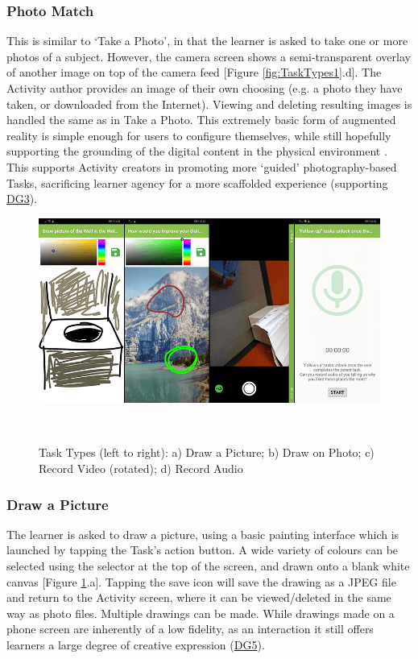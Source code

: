 \subsubsection*{Photo Match}
This is similar to `Take a Photo', in that the learner is asked to take one or more photos of a subject. However, the camera screen shows a semi-transparent overlay of another image on top of the camera feed [Figure \ref{fig:TaskTypes1}.d]. The Activity author provides an image of their own choosing (e.g. a photo they have taken, or downloaded from the Internet). Viewing and deleting resulting images is handled the same as in Take a Photo. This extremely basic form of augmented reality is simple enough for users to configure themselves, while still hopefully supporting the grounding of the digital content in the physical environment \citep{javornik2019}. This supports Activity creators in promoting more `guided' photography-based Tasks, sacrificing learner agency for a more scaffolded experience (supporting \hyperref[DG3]{DG3}).

\begin{figure}
  \centering
  \includegraphics[width=1\columnwidth]{images/chapter05/tasktypes2.png}
  \caption[Task Types (part 2)]{Task Types (left to right): a) Draw a Picture; b) Draw on Photo; c) Record Video (rotated); d) Record Audio}~\label{fig:TaskTypes2}
\end{figure}

\subsubsection*{Draw a Picture}
The learner is asked to draw a picture, using a basic painting interface which is launched by tapping the Task's action button. A wide variety of colours can be selected using the selector at the top of the screen, and drawn onto a blank white canvas [Figure \ref{fig:TaskTypes2}.a]. Tapping the save icon will save the drawing as a JPEG file and return to the Activity screen, where it can be viewed/deleted in the same way as photo files. Multiple drawings can be made. While drawings made on a phone screen are inherently of a low fidelity, as an interaction it still offers learners a large degree of creative expression (\hyperref[DG5]{DG5}).

